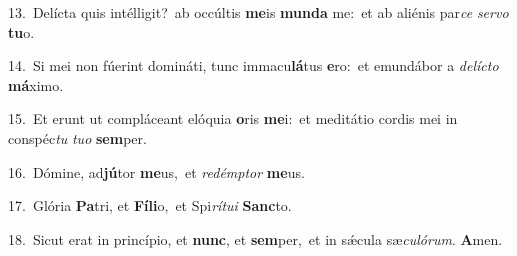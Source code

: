 {\numbfont\textcolor{\numbcolor}{13.}}~Delícta quis intélligit?~\dagger ab occúltis \textbf{me}\-is \textbf{mun}\-\textbf{da} me:~\star et ab aliénis par\textit{ce} \textit{ser}\-\textit{vo} \textbf{tu}\-o.\par
{\numbfont\textcolor{\numbcolor}{14.}}~Si mei non fúerint domináti, tunc immacu\-\textbf{lá}\-tus \textbf{e}\-ro:~\star et emundábor a \textit{de}\-\textit{líc}\textit{to} \textbf{má}\-ximo.\par
{\numbfont\textcolor{\numbcolor}{15.}}~Et erunt ut compláceant elóquia \textbf{o}\-ris \textbf{me}\-i:~\star et meditátio cordis mei in conspéc\textit{tu} \textit{tu}\-\textit{o} \textbf{sem}\-per.\par
{\numbfont\textcolor{\numbcolor}{16.}}~Dómine, ad\-\textbf{jú}\-tor \textbf{me}\-us,~\star et \textit{red}\-\textit{émp}\textit{tor} \textbf{me}\-us.\par
{\numbfont\textcolor{\numbcolor}{17.}}~Glória \textbf{Pa}\-tri, et \textbf{Fí}\-\textbf{li}o,~\star et Spi\-\textit{rí}\-\textit{tu}\textit{i} \textbf{Sanc}\-to.\par
{\numbfont\textcolor{\numbcolor}{18.}}~Sicut erat in princípio, et \textbf{nunc}\-, et \textbf{sem}\-per,~\star et in sǽcula sæ\-\textit{cu}\-\textit{ló}\textit{rum}. \textbf{A}\-men.\par
